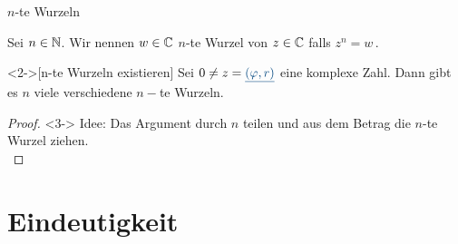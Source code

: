 \begin{frame}{$n$-te Wurzeln}
  \begin{definition}
   Sei $n\in \mathbb{N}$. Wir nennen $w\in \mathbb{C}$ $n$-te Wurzel von $z\in \mathbb{C}$ falls $z^n=w\,$.
  \end{definition}
  \begin{theorem}<2->[n-te Wurzeln existieren]
    Sei $0\neq z=\polar{\phi,r}$ eine komplexe Zahl. Dann gibt es $n$ viele verschiedene $n-$te Wurzeln.
  \end{theorem}
  \begin{proof}<3->
    Idee: Das Argument durch $n$ teilen und aus dem Betrag die $n$-te Wurzel ziehen.\\
  \end{proof}
 
\end{frame}


\section{Eindeutigkeit}

